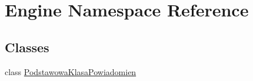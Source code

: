 \hypertarget{namespace_engine}{}\section{Engine Namespace Reference}
\label{namespace_engine}
\subsection*{Classes}
\begin{DoxyCompactItemize}
\item 
class \mbox{\hyperlink{class_engine_1_1_podstawowa_klasa_powiadomien}{Podstawowa\+Klasa\+Powiadomien}}
\end{DoxyCompactItemize}
